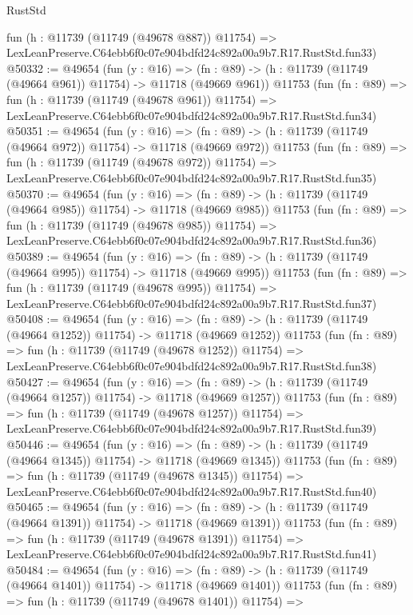 \begin{lexlean}{RustStd}
\begin{coremodule}
    fun (h : @11739 (@11749 (@49678 @887)) @11754) =>
    LexLeanPreserve.C64ebb6f0c07e904bdfd24c892a00a9b7.R17.RustStd.fun33)
@50332 := @49654
    (fun (y : @16) =>
    (fn : @89) -> (h : @11739 (@11749 (@49664 @961)) @11754) -> @11718 (@49669 @961))
    @11753
    (fun (fn : @89) =>
    fun (h : @11739 (@11749 (@49678 @961)) @11754) =>
    LexLeanPreserve.C64ebb6f0c07e904bdfd24c892a00a9b7.R17.RustStd.fun34)
@50351 := @49654
    (fun (y : @16) =>
    (fn : @89) -> (h : @11739 (@11749 (@49664 @972)) @11754) -> @11718 (@49669 @972))
    @11753
    (fun (fn : @89) =>
    fun (h : @11739 (@11749 (@49678 @972)) @11754) =>
    LexLeanPreserve.C64ebb6f0c07e904bdfd24c892a00a9b7.R17.RustStd.fun35)
@50370 := @49654
    (fun (y : @16) =>
    (fn : @89) -> (h : @11739 (@11749 (@49664 @985)) @11754) -> @11718 (@49669 @985))
    @11753
    (fun (fn : @89) =>
    fun (h : @11739 (@11749 (@49678 @985)) @11754) =>
    LexLeanPreserve.C64ebb6f0c07e904bdfd24c892a00a9b7.R17.RustStd.fun36)
@50389 := @49654
    (fun (y : @16) =>
    (fn : @89) -> (h : @11739 (@11749 (@49664 @995)) @11754) -> @11718 (@49669 @995))
    @11753
    (fun (fn : @89) =>
    fun (h : @11739 (@11749 (@49678 @995)) @11754) =>
    LexLeanPreserve.C64ebb6f0c07e904bdfd24c892a00a9b7.R17.RustStd.fun37)
@50408 := @49654
    (fun (y : @16) =>
    (fn : @89) -> (h : @11739 (@11749 (@49664 @1252)) @11754) -> @11718 (@49669 @1252))
    @11753
    (fun (fn : @89) =>
    fun (h : @11739 (@11749 (@49678 @1252)) @11754) =>
    LexLeanPreserve.C64ebb6f0c07e904bdfd24c892a00a9b7.R17.RustStd.fun38)
@50427 := @49654
    (fun (y : @16) =>
    (fn : @89) -> (h : @11739 (@11749 (@49664 @1257)) @11754) -> @11718 (@49669 @1257))
    @11753
    (fun (fn : @89) =>
    fun (h : @11739 (@11749 (@49678 @1257)) @11754) =>
    LexLeanPreserve.C64ebb6f0c07e904bdfd24c892a00a9b7.R17.RustStd.fun39)
@50446 := @49654
    (fun (y : @16) =>
    (fn : @89) -> (h : @11739 (@11749 (@49664 @1345)) @11754) -> @11718 (@49669 @1345))
    @11753
    (fun (fn : @89) =>
    fun (h : @11739 (@11749 (@49678 @1345)) @11754) =>
    LexLeanPreserve.C64ebb6f0c07e904bdfd24c892a00a9b7.R17.RustStd.fun40)
@50465 := @49654
    (fun (y : @16) =>
    (fn : @89) -> (h : @11739 (@11749 (@49664 @1391)) @11754) -> @11718 (@49669 @1391))
    @11753
    (fun (fn : @89) =>
    fun (h : @11739 (@11749 (@49678 @1391)) @11754) =>
    LexLeanPreserve.C64ebb6f0c07e904bdfd24c892a00a9b7.R17.RustStd.fun41)
@50484 := @49654
    (fun (y : @16) =>
    (fn : @89) -> (h : @11739 (@11749 (@49664 @1401)) @11754) -> @11718 (@49669 @1401))
    @11753
    (fun (fn : @89) =>
    fun (h : @11739 (@11749 (@49678 @1401)) @11754) =>

\end{coremodule}
\end{lexlean}
